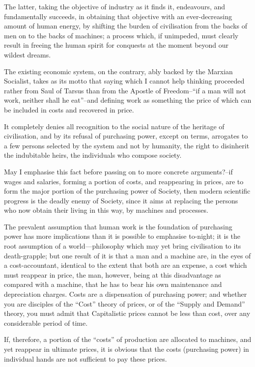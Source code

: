 \documentclass{book}
\begin{document}
The latter, taking the objective of industry as it finds it, endeavours, and fundamentally succeeds, in obtaining that objective with an ever-decreasing amount of human energy, by shifting the burden of civilisation from the backs of men on to the backs of machines; a process which, if unimpeded, must clearly result in freeing the human spirit for conquests at the moment beyond our wildest dreams.

The existing economic system, on the contrary, ably backed by the Marxian Socialist, takes as its motto that saying which I cannot help thinking proceeded rather from Saul of Tarsus than from the Apostle of Freedom–“if a man will not work, neither shall he eat”–and defining work as something the price of which can be included in costs and recovered in price.

It completely denies all recognition to the social nature of the heritage of civilisation, and by its refusal of purchasing power, except on terms, arrogates to a few persons selected by the system and not by humanity, the right to disinherit the indubitable heirs, the individuals who compose society.

May I emphasise this fact before passing on to more concrete arguments?–if wages and salaries, forming a portion of costs, and reappearing in prices, are to form the major portion of the purchasing power of Society, then modern scientific progress is the deadly enemy of Society, since it aims at replacing the persons who now obtain their living in this way, by machines and processes.

The prevalent assumption that human work is the foundation of purchasing power has more implications than it is possible to emphasise to-night; it is the root assumption of a world—philosophy which may yet bring civilisation to its death-grapple; but one result of it is that a man and a machine are, in the eyes of a cost-accountant, identical to the extent that both are an expense, a cost which must reappear in price, the man, however, being at this disadvantage as compared with a machine, that he has to bear his own maintenance and depreciation charges. Costs are a dispensation of purchasing power; and whether you are disciples of the “Cost” theory of prices, or of the “Supply and Demand” theory, you must admit that Capitalistic prices cannot be less than cost, over any considerable period of time.

If, therefore, a portion of the “costs” of production are allocated to machines, and yet reappear in ultimate prices, it is obvious that the costs (purchasing power) in individual hands are not sufficient to pay these prices.
\end{document}
